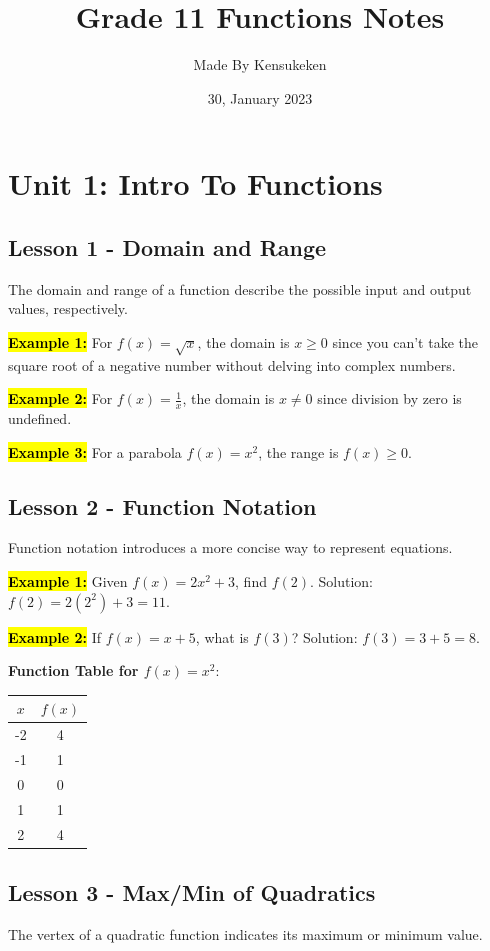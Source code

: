 \documentclass[12pt,a4paper]{article}
\title{Grade 11 Functions Notes}
\author{Made By Kensukeken}
\date{30, January 2023}
\begin{document}
\maketitle
\tableofcontents
\newpage
\section{Unit 1: Intro To Functions}

\subsection{Lesson 1 - Domain and Range}
The domain and range of a function describe the possible input and output values, respectively.



\textbf{\hl{Example 1:}} For \(f(x) = \sqrt{x}\), the domain is \(x \geq 0\) since you can't take the square root of a negative number without delving into complex numbers.

\textbf{\hl{Example 2:}} For \(f(x) = \frac{1}{x}\), the domain is \(x \neq 0\) since division by zero is undefined.

\textbf{\hl{Example 3:}} For a parabola \(f(x) = x^2\), the range is \(f(x) \geq 0\).

\subsection*{Lesson 2 - Function Notation}
Function notation introduces a more concise way to represent equations.

\textbf{\hl{Example 1:}} Given \(f(x) = 2x^2 + 3\), find \(f(2)\). Solution: \(f(2) = 2(2^2) + 3 = 11\).

\textbf{\hl{Example 2:}} If \(f(x) = x + 5\), what is \(f(3)\)? Solution: \(f(3) = 3 + 5 = 8\).

\textbf{Function Table for \(f(x) = x^2\)}:
\begin{center}
    \begin{tabular}{c|c}
        \( x \) & \( f(x) \) \\
        \hline
        -2 & 4 \\
        -1 & 1 \\
        0 & 0 \\
        1 & 1 \\
        2 & 4 \\
    \end{tabular}
\end{center}
\newpage
\subsection{Lesson 3 - Max/Min of Quadratics}
The vertex of a quadratic function indicates its maximum or minimum value.
\end{document}
